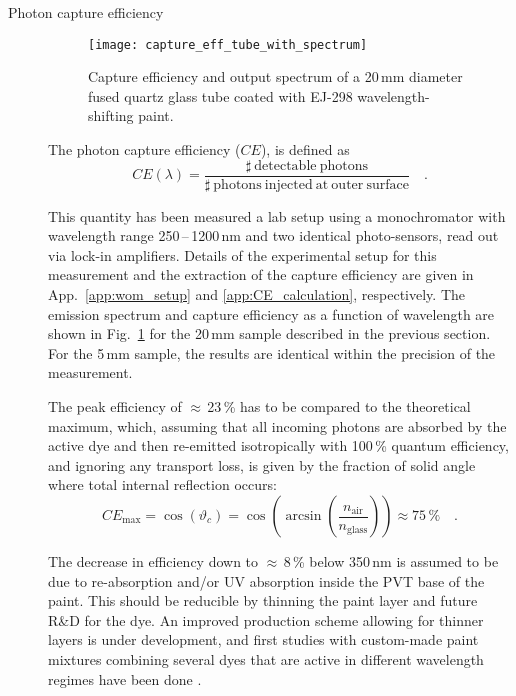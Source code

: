 \begin{description}

\item[Photon capture efficiency]
 \begin{figure}[t]
  \centering
   \texttt{[image: capture\_eff\_tube\_with\_spectrum]}
  \caption{Capture efficiency and output spectrum of a 20\,mm diameter fused 
    quartz glass tube coated with EJ-298 wavelength-shifting paint.}
  \label{fig:capture_eff}
 \end{figure}
The photon capture efficiency ($CE$), is defined as 
\begin{equation}
 CE(\lambda) = \frac{\mathrm{\sharp\ detectable\ photons}}
    {\mathrm{\sharp\ photons\ injected\ at\ outer\ surface}}\quad.
\end{equation}

This quantity has been measured a lab setup using a monochromator with 
wavelength range 250\,--\,1200\,nm and two identical photo-sensors, read out via 
lock-in amplifiers. Details of the experimental setup for this measurement and
the extraction of the capture efficiency are given in App.~\ref{app:wom_setup}
and \ref{app:CE_calculation}, respectively. The emission spectrum and capture
efficiency as a function of wavelength are shown in Fig.~\ref{fig:capture_eff}
for the 20\,mm sample described in the previous section. For the 5\,mm sample,
the results are identical within the precision of the measurement.

The peak efficiency of $\approx$\,23\,\% has to be compared to the theoretical
maximum, which, assuming that all incoming photons are absorbed by the active 
dye and then re-emitted isotropically with 100\,\% quantum efficiency, and
ignoring any transport loss, is given by the fraction of solid angle where total 
internal reflection occurs:
\begin{equation}
 CE_{\mathrm{max}} = \cos(\vartheta_c) = 
\cos\left(\arcsin\left(\frac{n_\mathrm{air}}{n_\mathrm{glass}}\right)\right) 
\approx 75\,\%\quad.
\end{equation}

The decrease in efficiency down to $\approx$\,8\,\% below 350\,nm is assumed to
be due to re-absorption and/or UV absorption inside the PVT base of the paint. 
This should be reducible by thinning the paint layer and future R\&D for
the dye. An improved production scheme allowing for thinner layers is under 
development, and first studies with custom-made paint mixtures combining
several dyes that are active in different wavelength regimes have been done
\cite{DustinMaster}.


\end{description}
